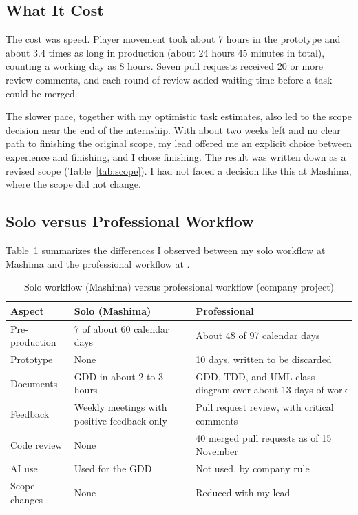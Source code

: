 \subsection{What It Cost}
The cost was speed. Player movement took about 7 hours in the prototype and about 3.4 times as long in production (about 24 hours 45 minutes in total), counting a working day as 8 hours. Seven pull requests received 20 or more review comments, and each round of review added waiting time before a task could be merged.

The slower pace, together with my optimistic task estimates, also led to the scope decision near the end of the internship. With about two weeks left and no clear path to finishing the original scope, my lead offered me an explicit choice between experience and finishing, and I chose finishing. The result was written down as a revised scope (Table~\ref{tab:scope}). I had not faced a decision like this at Mashima, where the scope did not change.

\subsection{Solo versus Professional Workflow}
Table~\ref{tab:comparison} summarizes the differences I observed between my solo workflow at Mashima and the professional workflow at \companyName{}.

\begin{table}[htbp]
    \centering
    \caption{Solo workflow (Mashima) versus professional workflow (company project)}
    \label{tab:comparison}
    \begin{tabular}{p{3cm}p{5.5cm}p{5.5cm}}
        \toprule
        \textbf{Aspect} & \textbf{Solo (Mashima)} & \textbf{Professional} \\
        \midrule
        Pre-production & 7 of about 60 calendar days & About 48 of 97 calendar days \\
        Prototype & None & 10 days, written to be discarded \\
        Documents & GDD in about 2 to 3 hours & GDD, TDD, and UML class diagram over about 13 days of work \\
        Feedback & Weekly meetings with positive feedback only & Pull request review, with critical comments \\
        Code review & None & 40 merged pull requests as of 15 November \\
        AI use & Used for the GDD & Not used, by company rule \\
        Scope changes & None & Reduced with my lead \\
        \bottomrule
    \end{tabular}
\end{table}

